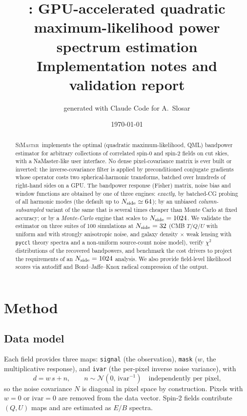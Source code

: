 \documentclass[11pt,a4paper]{article}
\title{\simaster: GPU-accelerated quadratic maximum-likelihood power
  spectrum estimation\\[2mm]\large Implementation notes and validation report}
\author{generated with Claude Code for A.~Slosar}
\date{\today}
\newcommand{\simaster}{\textsc{SiMaster}}
\begin{document}
\maketitle

\begin{abstract}
\simaster\ implements the optimal (quadratic maximum-likelihood, QML)
bandpower estimator for arbitrary collections of correlated spin-0 and
spin-2 fields on cut skies, with a NaMaster-like user interface.  No dense
pixel-covariance matrix is ever built or inverted: the inverse-covariance
filter is applied by preconditioned conjugate gradients whose operator costs
two spherical-harmonic transforms, batched over hundreds of right-hand sides
on a GPU.  The bandpower response (Fisher) matrix, noise bias and window
functions are obtained by one of three engines: \emph{exactly}, by
batched-CG probing of all harmonic modes (the default up to
$N_{\rm side}\simeq 64$); by an unbiased \emph{column-subsampled} variant of
the same that is several times cheaper than Monte Carlo at fixed accuracy;
or by a \emph{Monte-Carlo} engine that scales to $N_{\rm side}=1024$.  We
validate the estimator on three suites of 100 simulations at
$N_{\rm side}=32$ (CMB $T/Q/U$ with uniform and with strongly anisotropic
noise, and galaxy density $\times$ weak lensing with \texttt{pyccl} theory
spectra and a non-uniform source-count noise model), verify $\chi^2$
distributions of the recovered bandpowers, and benchmark the cost drivers
to project the requirements of an $N_{\rm side}=1024$ analysis.  We also
provide field-level likelihood scores via autodiff and Bond--Jaffe--Knox
radical compression of the output.
\end{abstract}

\tableofcontents

\section{Method}
\label{sec:method}

\subsection{Data model}
Each field provides three maps: \texttt{signal} (the observation),
\texttt{mask} ($w$, the multiplicative response), and \texttt{ivar} (the
per-pixel inverse noise variance), with
\begin{equation}
  d = w\,s + n,\qquad n\sim\mathcal N(0,\,\mathrm{ivar}^{-1})
  \quad\text{independently per pixel,}
\end{equation}
so the noise covariance $N$ is diagonal in pixel space by construction.
Pixels with $w=0$ or $\mathrm{ivar}=0$ are removed from the data vector.
Spin-2 fields contribute $(Q,U)$ maps and are estimated as $E/B$ spectra.
\end{document}
